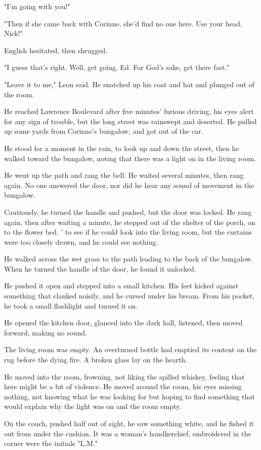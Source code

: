 \documentclass{novel}
\begin{document}
"I'm going with you!"

"Then if she came back with Corinne, she'd find no one here. Use your head, Nick!"

English hesitated, then shrugged.

"I guess that's right. Well, get going, Ed. For God's sake, get there fast."

"Leave it to me," Leon said. He snatched up his coat and hat and plunged out of the room.

He reached Lawrence Boulevard after five minutes' furious driving, his eyes alert for any sign of trouble, but the long street was rainswept and deserted. He pulled up some yards from Corinne's bungalow, and got out of the car.

He stood for a moment in the rain, to look up and down the street, then he walked toward the bungalow, noting that there was a light on in the living room.

He went up the path and rang the bell. He waited several minutes, then rang again. No one answered the door, nor did he hear any sound of movement in the bungalow.

Cautiously, he turned the handle and pushed, but the door was locked. He rang again, then after waiting a minute, he stepped out of the shelter of the porch, on to the flower bed. ' to see if he could look into the living room, but the curtains were too closely drawn, and he could see nothing.

He walked across the wet grass to the path leading to the back of the bungalow. When he turned the handle of the door, he found it unlocked.

He pushed it open and stepped into a small kitchen. His feet kicked against something that clanked noisily, and he cursed under his bream. From his pocket, he took a small flashlight and turned it on.

He opened the kitchen door, glanced into the dark hall, listened, then moved forward, making no sound.

The living room was empty. An overturned bottle had emptied its content on the rug before the dying fire. A broken glass lay on the hearth.

He moved into the room, frowning, not liking the spilled whiskey, feeling that here might be a bit of violence. He moved around the room, his eyes missing nothing, not knowing what he was looking for but hoping to find something that would explain why the light was on and the room empty.

On the couch, pushed half out of sight, he saw something white, and he fished it out from under the cushion. It was a woman's handkerchief, embroidered in the corner were the initials "L.M."
\end{document}
